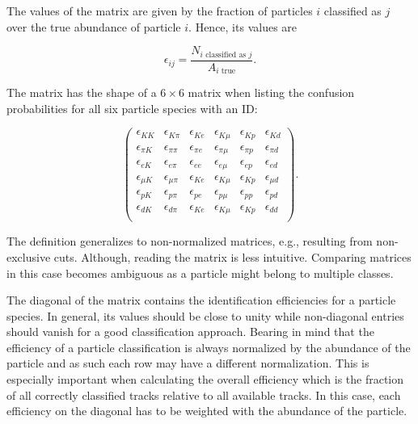 The values of the matrix are given by the fraction of particles $i$ classified as $j$ over the true abundance of particle $i$. Hence, its values are

\begin{equation}
	\epsilon_{i j} = \frac{N_{i \text{ classified as } j}}{A_{i \text{ true}}}.
\end{equation}

The matrix has the shape of a $6 \times 6$ matrix when listing the confusion probabilities for all six particle species with an ID:

\begin{equation}
	\begin{pmatrix}
		\epsilon_{K K} & \epsilon_{K \pi} & \epsilon_{K e} & \epsilon_{K \mu} & \epsilon_{K p} & \epsilon_{K d} \\
		\epsilon_{\pi K} & \epsilon_{\pi \pi} & \epsilon_{\pi e} & \epsilon_{\pi \mu} & \epsilon_{\pi p} & \epsilon_{\pi d} \\
		\epsilon_{e K} & \epsilon_{e \pi} & \epsilon_{e e} & \epsilon_{e \mu} & \epsilon_{e p} & \epsilon_{e d} \\
		\epsilon_{\mu K} & \epsilon_{\mu \pi} & \epsilon_{K e} & \epsilon_{K \mu} & \epsilon_{K p} & \epsilon_{\mu d} \\
		\epsilon_{p K} & \epsilon_{p \pi} & \epsilon_{p e} & \epsilon_{p \mu} & \epsilon_{p p} & \epsilon_{p d} \\
		\epsilon_{d K} & \epsilon_{d \pi} & \epsilon_{K e} & \epsilon_{K \mu} & \epsilon_{K p} & \epsilon_{d d} \\
	\end{pmatrix}.
\end{equation}

The definition generalizes to non-normalized matrices, e.g., resulting from non-exclusive cuts. Although, reading the matrix is less intuitive. Comparing matrices in this case becomes ambiguous as a particle might belong to multiple classes.

The diagonal of the matrix contains the identification efficiencies for a particle species. In general, its values should be close to unity while non-diagonal entries should vanish for a good classification approach. Bearing in mind that the efficiency of a particle classification is always normalized by the abundance of the particle and as such each row may have a different normalization. This is especially important when calculating the overall efficiency which is the fraction of all correctly classified tracks relative to all available tracks. In this case, each efficiency on the diagonal has to be weighted with the abundance of the particle.

